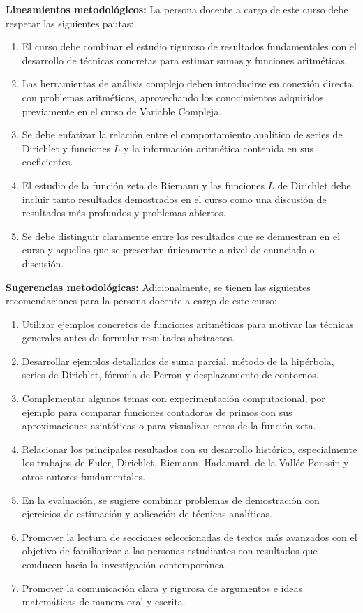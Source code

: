 \begin{refsection}
\noindent \textbf{Lineamientos metodológicos:} La persona docente a cargo de este curso debe respetar las siguientes pautas:
\begin{enumerate}
\item El curso debe combinar el estudio riguroso de resultados fundamentales con el desarrollo de técnicas concretas para estimar sumas y funciones aritméticas.
\item Las herramientas de análisis complejo deben introducirse en conexión directa con problemas aritméticos, aprovechando los conocimientos adquiridos previamente en el curso de Variable Compleja.
\item Se debe enfatizar la relación entre el comportamiento analítico de series de Dirichlet y funciones $L$ y la información aritmética contenida en sus coeficientes.
\item El estudio de la función zeta de Riemann y las funciones $L$ de Dirichlet debe incluir tanto resultados demostrados en el curso como una discusión de resultados más profundos y problemas abiertos.
\item Se debe distinguir claramente entre los resultados que se demuestran en el curso y aquellos que se presentan únicamente a nivel de enunciado o discusión.
\end{enumerate}

\textbf{Sugerencias metodológicas:} Adicionalmente, se tienen las siguientes recomendaciones para la persona docente a cargo de este curso:
\begin{enumerate}
\item Utilizar ejemplos concretos de funciones aritméticas para motivar las técnicas generales antes de formular resultados abstractos.
\item Desarrollar ejemplos detallados de suma parcial, método de la hipérbola, series de Dirichlet, fórmula de Perron y desplazamiento de contornos.
\item Complementar algunos temas con experimentación computacional, por ejemplo para comparar funciones contadoras de primos con sus aproximaciones asintóticas o para visualizar ceros de la función zeta.
\item Relacionar los principales resultados con su desarrollo histórico, especialmente los trabajos de Euler, Dirichlet, Riemann, Hadamard, de la Vallée Poussin y otros autores fundamentales.
\item En la evaluación, se sugiere combinar problemas de demostración con ejercicios de estimación y aplicación de técnicas analíticas.
\item Promover la lectura de secciones seleccionadas de textos más avanzados con el objetivo de familiarizar a las personas estudiantes con resultados que conducen hacia la investigación contemporánea.
\item Promover la comunicación clara y rigurosa de argumentos e ideas matemáticas de manera oral y escrita.
\end{enumerate}


\end{refsection}
